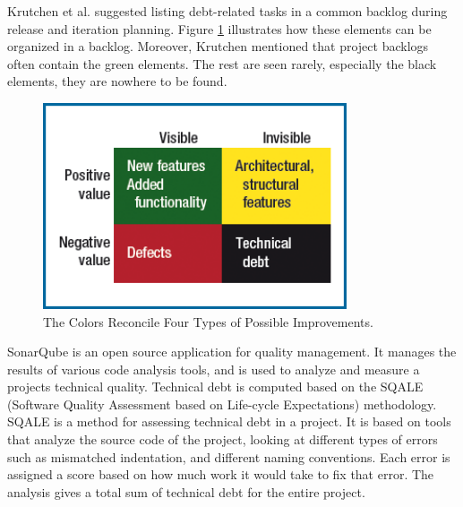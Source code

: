 Krutchen et al.\cite{krutchen} suggested listing debt-related tasks in a common backlog during release and iteration planning. Figure \ref{fig:fourColorBacklog} illustrates how these elements can be organized in a backlog. Moreover, Krutchen mentioned that project backlogs often contain the green elements. The rest are seen rarely, especially the black elements, they are nowhere to be found.


\begin{figure}[ht!]
	\centering
	\includegraphics[width=0.8\textwidth]{images/fourColorBacklog.png}
	\caption{The Colors Reconcile Four Types of Possible Improvements.}
	\label{fig:fourColorBacklog}
\end{figure}

SonarQube is an open source application for quality management\cite{sonarsource2013sonarqube}. It manages the results of various code analysis tools, and is used to analyze and measure a projects technical quality. Technical debt is computed based on the SQALE (Software Quality Assessment based on Life-cycle Expectations) methodology\cite{letouzey2012sqale}. SQALE is a method for assessing technical debt in a project. It is based on tools that analyze the source code of the project, looking at different types of errors such as mismatched indentation, and different naming conventions. Each error is assigned a score based on how much work it would take to fix that error. The analysis gives a total sum of technical debt for the entire project.






